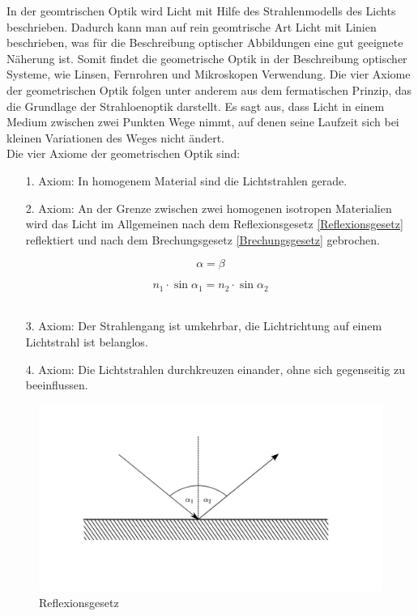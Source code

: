 In der geomtrischen Optik wird Licht mit Hilfe des Strahlenmodells des Lichts beschrieben. Dadurch kann man auf rein geomtrische Art Licht mit Linien beschrieben, was für die Beschreibung optischer Abbildungen eine gut geeignete Näherung ist. Somit findet die geometrische Optik in der Beschreibung optischer Systeme, wie Linsen, Fernrohren und Mikroskopen Verwendung. Die vier Axiome der geometrischen Optik folgen unter anderem aus dem fermatischen Prinzip, das die Grundlage der Strahloenoptik darstellt. Es sagt aus, dass Licht in einem Medium zwischen zwei Punkten Wege nimmt, auf denen seine Laufzeit sich bei kleinen Variationen des Weges nicht ändert. \\
Die vier Axiome der geometrischen Optik sind: \\
\begin{itemize}
\item[1.]Axiom: In homogenem Material sind die Lichtstrahlen gerade. \\
\item[2.]Axiom: An der Grenze zwischen zwei homogenen isotropen Materialien wird das Licht im Allgemeinen nach dem Reflexionsgesetz \ref{Reflexionsgesetz} reflektiert und nach dem Brechungsgesetz
\ref{Brechungsgesetz} gebrochen. 
\end{itemize}
    \begin{equation} \label{Reflexionsgesetz}
        \alpha = \beta
    \end{equation}
    
    \begin{equation} \label{Brechungsgesetz}
        n_1 \cdot \sin{\alpha_1} = n_2 \cdot \sin{\alpha_2}
    \end{equation}
    \\
\begin{itemize}
\item[3.]Axiom: Der Strahlengang ist umkehrbar, die Lichtrichtung auf einem Lichtstrahl ist belanglos. \\
\item[4.]Axiom: Die Lichtstrahlen durchkreuzen einander, ohne sich gegenseitig zu beeinflussen. \\
\end{itemize}  
    \begin{figure}
        \centering
        \includegraphics{Geometrische_Optik/Protokoll/fig/Reflexionsgesetz.png}
        \caption{Reflexionsgesetz}
        \label{fig:Reflexionsgesetz}
    \end{figure}
    

